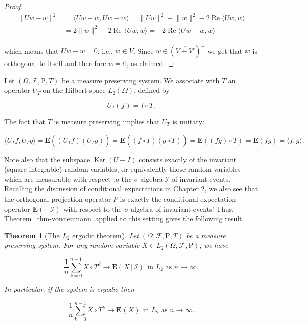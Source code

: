 \documentclass[11pt]{report}
\theoremstyle{plain}
\newtheorem{thm}{Theorem}[chapter]
\theoremstyle{definition}
\begin{document}
\begin{proof}
\begin{align*}
\lVert Uw-w \rVert^2 &= \langle Uw-w, Uw-w\rangle = \lVert Uw \rVert^2 + \lVert w \rVert^2 - 2\operatorname{Re} \langle Uw,w\rangle  \\ &=
2\lVert w \rVert^2 - 2\operatorname{Re} \langle Uw,w\rangle
= - 2\operatorname{Re} \langle Uw-w,w\rangle
\end{align*}

\noindent which means that $Uw-w = 0$, i.e., $w\in V$. Since
$w\in \left(\overline{V+V'}\right)^\perp$ we get that
$w$ is orthogonal to itself and therefore $w=0$, as
claimed.
\end{proof}

\noindent Let $(\Omega, \mathcal{F}, \mathrm{P}, T)$ be a
measure preserving system. We associate with $T$ an
operator $U_T$ on the Hilbert space $L_2(\Omega)$,
defined  by

\[
U_T(f) = f\circ T.
\]

\noindent The fact that $T$ is measure preserving implies that
$U_T$ is unitary:

\[
\langle U_T f, U_T g \rangle = \mathbf{E}( (U_T f) \overline{(U_T g)} )
= \mathbf{E}( (f\circ T) \overline{(g\circ T)} )
= \mathbf{E}( (f\overline{g})\circ T ) = \mathbf{E}( f\overline{g} ) = \langle f,g\rangle.
\]

\noindent Note also that the subspace $\operatorname{Ker}(U-I)$
consists exactly of the invariant (square-integrable)
random variables, or equivalently those random
variables which are measurable with respect to the
$\sigma$-algebra $\mathcal{I}$ of invariant events.
Recalling the discussion of conditional expectations
in Chapter 2, we also see that the orthogonal
projection operator $P$ is exactly the conditional
expectation operator
$\mathbf{E}\left(\cdot\,|\,\mathcal{I}\right)$ with
respect to the $\sigma$-algebra of invariant events!
Thus, \hyperref[thm-vonneumann]{Theorem~\ref*{thm-vonneumann}} applied to this setting
gives the following result.

\begin{thm}[The $L_2$ ergodic theorem]
Let $(\Omega, \mathcal{F}, \mathrm{P}, T)$ be a
measure preserving system. For any random variable
$X\in L_2(\Omega, \mathcal{F}, \mathrm{P})$, we have

\[
\frac{1}{n} \sum_{k=0}^{n-1} X\circ T^{k} \to \mathbf{E}\left(X\,|\,\mathcal{I}\right)\ \ \textrm{in $L_2$ as }n\to\infty.
\]

\noindent In particular, if the system is ergodic then

\[
\frac{1}{n} \sum_{k=0}^{n-1} X\circ T^{k} \to \mathbf{E}(X)\ \ \textrm{in $L_2$ as }n\to\infty.
\]

\end{thm}
\end{document}
